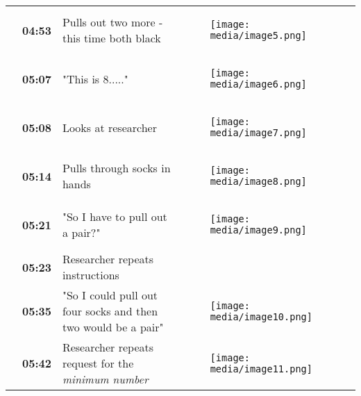 \documentclass{article}
\begin{document}
\begin{table}

  
\begin{tabular}{l  l  l  l}

   & \textbf{04:53} & Pulls out two more - this time both black & 
\begin{figure}

  \texttt{[image: media/image5.png]}
\caption{}
\label{}


\end{figure}
\\
 & \textbf{05:07} & "This is 8....." & 
\begin{figure}

  \texttt{[image: media/image6.png]}
\caption{}
\label{}


\end{figure}
\\
 & \textbf{05:08} & Looks at researcher & 
\begin{figure}

  \texttt{[image: media/image7.png]}
\caption{}
\label{}


\end{figure}
\\
 & \textbf{05:14} & Pulls through socks in hands & 
\begin{figure}

  \texttt{[image: media/image8.png]}
\caption{}
\label{}


\end{figure}
\\
 & \textbf{05:21} & "So I have to pull out a pair?" & 
\begin{figure}

  \texttt{[image: media/image9.png]}
\caption{}
\label{}


\end{figure}
\\
 & \textbf{05:23} & Researcher repeats instructions & \\
 & \textbf{05:35} & "So I could pull out four socks and then two would be a pair" & 
\begin{figure}

  \texttt{[image: media/image10.png]}
\caption{}
\label{}


\end{figure}
\\
 & \textbf{05:42} & Researcher repeats request for the \emph{minimum number} & 
\begin{figure}

  \texttt{[image: media/image11.png]}
\caption{}
\label{}



\end{figure}
\end{tabular}
\end{table}
\end{document}
